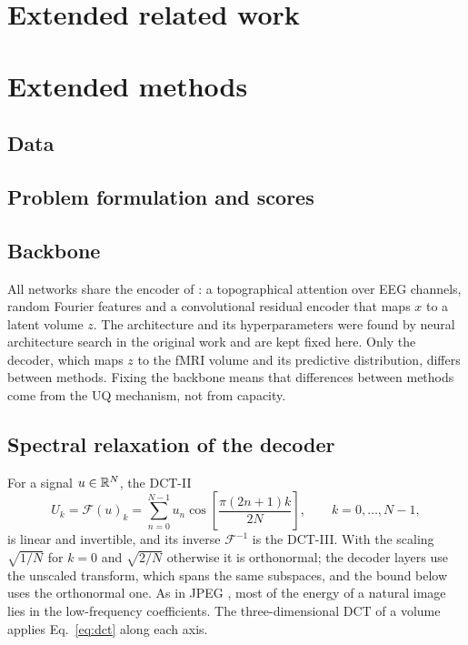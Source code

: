 \section{Extended related work}\label{supp:related}


\section{Extended methods}\label{supp:methods}
\subsection{Data}


\subsection{Problem formulation and scores}\label{supp:problem}


\subsection{Backbone}
All networks share the encoder of \citet{calhas2022eeg}: a topographical attention over EEG channels, random Fourier features and a convolutional residual encoder that maps $x$ to a latent volume $z$. The architecture and its hyperparameters were found by neural architecture search in the original work and are kept fixed here. Only the decoder, which maps $z$ to the fMRI volume and its predictive distribution, differs between methods. Fixing the backbone means that differences between methods come from the UQ mechanism, not from capacity.

\subsection{Spectral relaxation of the decoder}\label{sec:relaxation}

For a signal $u\in\mathbb{R}^N$, the DCT-II \citep{ahmed1974discrete}
\begin{equation}\label{eq:dct}
	U_k = \mathcal{F}(u)_k = \sum_{n=0}^{N-1} u_n \cos\!\left[\frac{\pi(2n+1)k}{2N}\right],\qquad k = 0,\dots,N-1,
\end{equation}
is linear and invertible, and its inverse $\mathcal{F}^{-1}$ is the DCT-III. With the scaling $\sqrt{1/N}$ for $k=0$ and $\sqrt{2/N}$ otherwise it is orthonormal; the decoder layers use the unscaled transform, which spans the same subspaces, and the bound below uses the orthonormal one. As in JPEG \citep{wallace1992jpeg}, most of the energy of a natural image lies in the low-frequency coefficients. The three-dimensional DCT of a volume applies Eq.~\eqref{eq:dct} along each axis.

